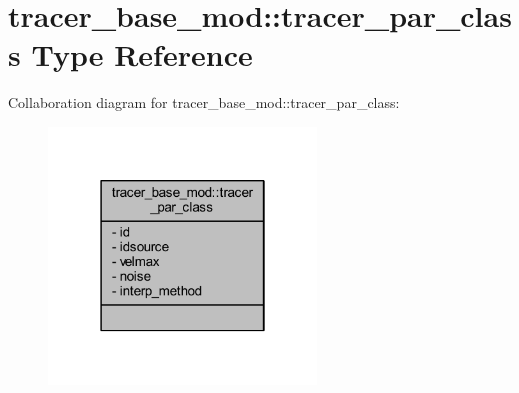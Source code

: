 \hypertarget{structtracer__base__mod_1_1tracer__par__class}{}\section{tracer\+\_\+base\+\_\+mod\+:\+:tracer\+\_\+par\+\_\+class Type Reference}
\label{structtracer__base__mod_1_1tracer__par__class}


Collaboration diagram for tracer\+\_\+base\+\_\+mod\+:\+:tracer\+\_\+par\+\_\+class\+:\nopagebreak
\begin{figure}[H]
\begin{center}
\leavevmode
\includegraphics[width=202pt]{structtracer__base__mod_1_1tracer__par__class__coll__graph}
\end{center}
\end{figure}
